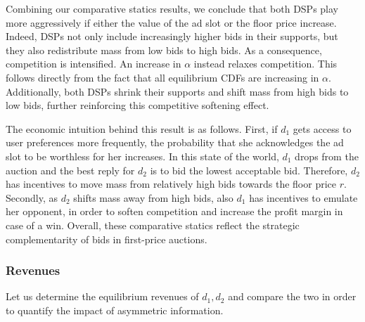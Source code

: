 \documentclass[11pt]{article}
\theoremstyle{plain}
\theoremstyle{definition}
\theoremstyle{plain}
\theoremstyle{plain}
\theoremstyle{plain}
\theoremstyle{plain}
\numberwithin{equation}{section}
\begin{document}
\noindent Combining our comparative statics results, we conclude that both DSPs play more aggressively if either the value of the ad slot or the floor price increase. Indeed, DSPs not only include increasingly higher bids in their supports, but they also redistribute mass from low bids to high bids. As a consequence, competition is intensified. An increase in $ \alpha $ instead relaxes competition. This follows directly from the fact that all equilibrium CDFs are increasing in $ \alpha $. Additionally, both DSPs shrink their supports and shift mass from high bids to low bids, further reinforcing this competitive softening effect. \par
\vspace{2mm}
\noindent The economic intuition behind this result is as follows. First, if $ d_1 $ gets access to user preferences more frequently, the probability that she acknowledges the ad slot to be worthless for her increases. In this state of the world, $ d_1 $ drops from the auction and the best reply for $ d_2 $ is to bid the lowest acceptable bid. Therefore, $ d_2 $ has incentives to move mass from relatively high bids towards the floor price $ r $. Secondly, as $ d_2 $ shifts mass away from high bids, also $ d_1 $ has incentives to emulate her opponent, in order to soften competition and increase the profit margin in case of a win. Overall, these comparative statics reflect the strategic complementarity of bids in first-price auctions. \par 
\vspace{4mm}

\subsubsection{Revenues}

\noindent Let us determine the equilibrium revenues of $ d_1, d_2 $ and compare the two in order to quantify the impact of asymmetric information. 
\vspace{0.2cm}
\end{document}
